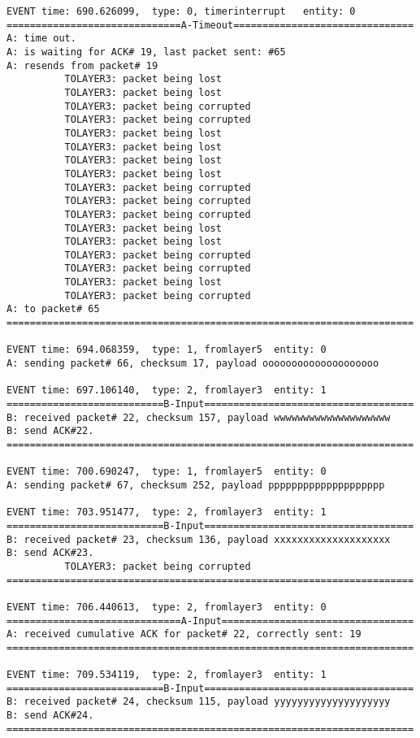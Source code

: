 \documentclass[12pt]{article}
\begin{document}
\begin{verbatim}
EVENT time: 690.626099,  type: 0, timerinterrupt   entity: 0
==============================A-Timeout===============================
A: time out. 
A: is waiting for ACK# 19, last packet sent: #65
A: resends from packet# 19 
          TOLAYER3: packet being lost
          TOLAYER3: packet being lost
          TOLAYER3: packet being corrupted
          TOLAYER3: packet being corrupted
          TOLAYER3: packet being lost
          TOLAYER3: packet being lost
          TOLAYER3: packet being lost
          TOLAYER3: packet being lost
          TOLAYER3: packet being corrupted
          TOLAYER3: packet being corrupted
          TOLAYER3: packet being corrupted
          TOLAYER3: packet being lost
          TOLAYER3: packet being lost
          TOLAYER3: packet being corrupted
          TOLAYER3: packet being corrupted
          TOLAYER3: packet being lost
          TOLAYER3: packet being corrupted
A: to packet# 65
======================================================================

EVENT time: 694.068359,  type: 1, fromlayer5  entity: 0
A: sending packet# 66, checksum 17, payload oooooooooooooooooooo

EVENT time: 697.106140,  type: 2, fromlayer3  entity: 1
===========================B-Input====================================
B: received packet# 22, checksum 157, payload wwwwwwwwwwwwwwwwwwww
B: send ACK#22.
======================================================================

EVENT time: 700.690247,  type: 1, fromlayer5  entity: 0
A: sending packet# 67, checksum 252, payload pppppppppppppppppppp

EVENT time: 703.951477,  type: 2, fromlayer3  entity: 1
===========================B-Input====================================
B: received packet# 23, checksum 136, payload xxxxxxxxxxxxxxxxxxxx
B: send ACK#23.
          TOLAYER3: packet being corrupted
======================================================================

EVENT time: 706.440613,  type: 2, fromlayer3  entity: 0
==============================A-Input=================================
A: received cumulative ACK for packet# 22, correctly sent: 19
======================================================================

EVENT time: 709.534119,  type: 2, fromlayer3  entity: 1
===========================B-Input====================================
B: received packet# 24, checksum 115, payload yyyyyyyyyyyyyyyyyyyy
B: send ACK#24.
======================================================================


\end{verbatim}
\end{document}
